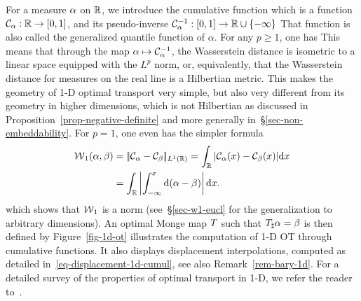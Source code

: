 \begin{rem}\label{rem-1d-ot-generic}
For a measure $\alpha$ on $\mathbb{R}$, we introduce the cumulative function
which is a function $\mathcal{C}_{\alpha} : \mathbb{R} \rightarrow [0,1]$, and its pseudo-inverse  $\mathcal{C}_{\alpha}^{-1} : [0,1] \rightarrow \mathbb{R} \cup \{-\infty\}$ 
%
That function is also called the generalized quantile function of $\alpha$. For any $p \geq 1$, one has
This means that through the map $\alpha \mapsto \mathcal{C}_{\alpha}^{-1}$, the Wasserstein distance is isometric to a linear space equipped with the $L^p$ norm, or, equivalently, that the Wasserstein distance for measures on the real line is a Hilbertian metric. 
This makes the geometry of 1-D optimal transport very simple, but also very different from its geometry in higher dimensions, which is not Hilbertian as discussed in Proposition~\ref{prop-negative-definite} and more generally in~\S\ref{sec-non-embeddability}.
%
For $p=1$, one even has the simpler formula
\begin{align}\label{eq-w1-1d}
	\operatorname{\mathcal{W}}_1(\alpha,\beta) &= |\!|  \mathcal{C}_{\alpha} - \mathcal{C}_{\beta}  |\!|_{L^1(\mathbb{R})} = 
	\int_{\mathbb{R}} | \mathcal{C}_{\alpha}(x) - \mathcal{C}_{\beta}(x) | \mathrm{d} x \\
	&= \int_{\mathbb{R}} \left\lvert \int_{-\infty}^x \mathrm{d}(\alpha-\beta) \right\rvert \mathrm{d} x.
\end{align}
which shows that $\operatorname{\mathcal{W}}_1$ is a norm (see~\S\ref{sec-w1-eucl} for the generalization to arbitrary dimensions). 
%
An optimal Monge map $T$ such that $T_\sharp \alpha=\beta$ is then defined by
Figure~\ref{fig-1d-ot} illustrates the computation of 1-D OT through cumulative functions. It also displays displacement interpolations, computed as detailed in~\eqref{eq-displacement-1d-cumul}, see also Remark~\ref{rem-bary-1d}. For a detailed survey of the properties of optimal transport in 1-D, we refer the reader to~\cite[Chapter 2]{SantambrogioBook}.
\end{rem}


